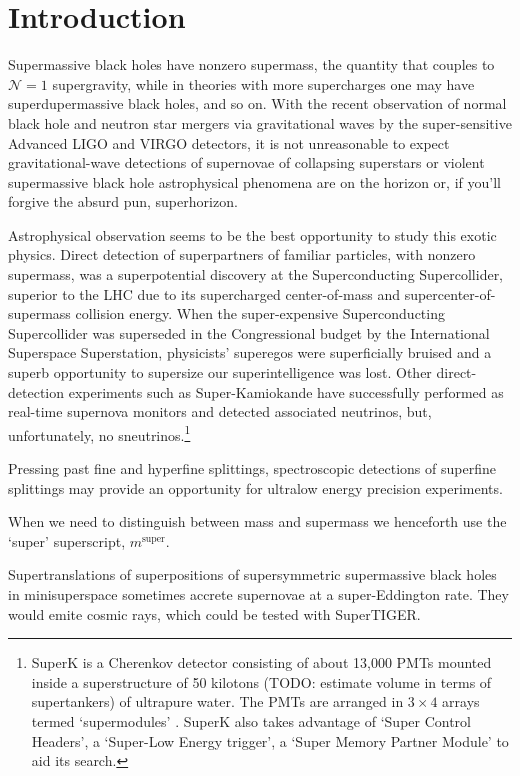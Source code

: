 \section{Introduction}

Supermassive black holes have nonzero supermass, the quantity that couples to $\mathcal{N}=1$ supergravity, while in theories with more supercharges one may have superdupermassive black holes, and so on.
With the recent observation of normal black hole \cite{Abbott:2016blz,Abbott:2016nmj,Abbott:2017vtc,Abbott:2017oio,Abbott:2017gyy} and neutron star\cite{TheLIGOScientific:2017qsa} mergers via gravitational waves by the super-sensitive Advanced LIGO and VIRGO detectors, it is not unreasonable to expect gravitational-wave detections of supernovae of collapsing superstars or violent supermassive black hole astrophysical phenomena are on the horizon or, if you'll forgive the absurd pun, superhorizon.

Astrophysical observation seems to be the best opportunity to study this exotic physics.
Direct detection of superpartners of familiar particles, with nonzero supermass, was a superpotential discovery at the Superconducting Supercollider, superior to the LHC due to its supercharged center-of-mass and supercenter-of-supermass collision energy.
When the super-expensive Superconducting Supercollider was superseded in the Congressional budget by the International Superspace Superstation, physicists' superegos were superficially bruised and a superb opportunity to supersize our superintelligence was lost.
Other direct-detection experiments such as Super-Kamiokande have successfully performed as real-time supernova monitors and detected associated neutrinos, but, unfortunately, no sneutrinos.\footnote{ 
SuperK is a Cherenkov detector consisting of about 13,000 PMTs mounted inside a superstructure of 50 kilotons (TODO: estimate volume in terms of supertankers) of ultrapure water.  The PMTs are arranged in $3\times4$ arrays termed `supermodules' \cite{Fukuda:2002uc}.
SuperK also takes advantage of `Super Control Headers', a `Super-Low Energy trigger', a `Super Memory Partner Module' to aid its search.
}

Pressing past fine and hyperfine splittings, spectroscopic detections of superfine splittings may provide an opportunity for ultralow energy precision experiments.

When we need to distinguish between mass and supermass we henceforth use the `super' superscript, $m^{\text{super}}$.

Supertranslations of superpositions of supersymmetric supermassive black holes in minisuperspace sometimes accrete supernovae at a super-Eddington rate.
They would emite cosmic rays, which could be tested with SuperTIGER.

